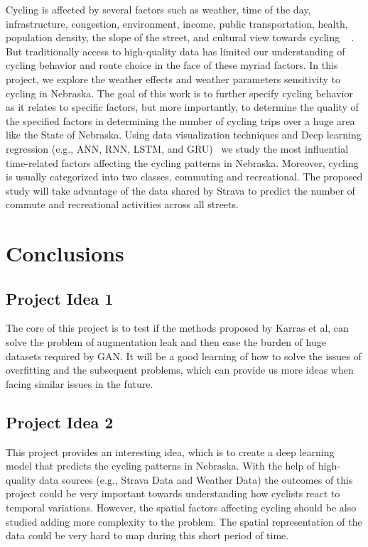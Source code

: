 \documentclass{report}
\begin{document}
Cycling is affected by several factors such as weather, time of the day, infrastructure, congestion, environment, income, public transportation, health, population density, the slope of the street, and cultural view towards cycling ~\cite{musakwa2016mapping, roy2019correcting, hochmair2019estimating} . But traditionally access to high-quality data has limited our understanding of cycling behavior and route choice in the face of these myriad factors. In this project, we explore the weather effects and weather parameters sensitivity to cycling in Nebraska. The goal of this work is to further specify cycling behavior as it relates to specific factors, but more importantly, to determine the quality of the specified factors in determining the number of cycling trips over a huge area like the State of Nebraska. 
Using data visualization techniques and Deep learning regression (e.g., ANN, RNN, LSTM, and GRU)~\cite{hassoun1995fundamentals, graves2013generating} we study the most influential time-related factors affecting the cycling patterns in Nebraska. Moreover, cycling is usually categorized into two classes, commuting and recreational. The proposed study will take advantage of the data shared by Strava to predict the number of commute and recreational activities across all streets. 

\section{Conclusions}
\subsection{Project Idea 1}
The core of this project is to test if the methods proposed by Karras et al, can solve the problem of augmentation leak and then ease the burden of huge datasets required by GAN. It will be a good learning of how to solve the issues of overfitting and the subsequent problems, which can provide us more ideas when facing similar issues in the future.

\subsection{Project Idea 2}
This project provides an interesting idea, which is to create a deep learning model that predicts the cycling patterns in Nebraska. With the help of high-quality data sources (e.g., Strava Data and Weather Data) the outcomes of this project could be very important towards understanding how cyclists react to temporal variations. However, the spatial factors affecting cycling should be also studied adding more complexity to the problem. The spatial representation of the data could be very hard to map during this short period of time. 




\end{document}
